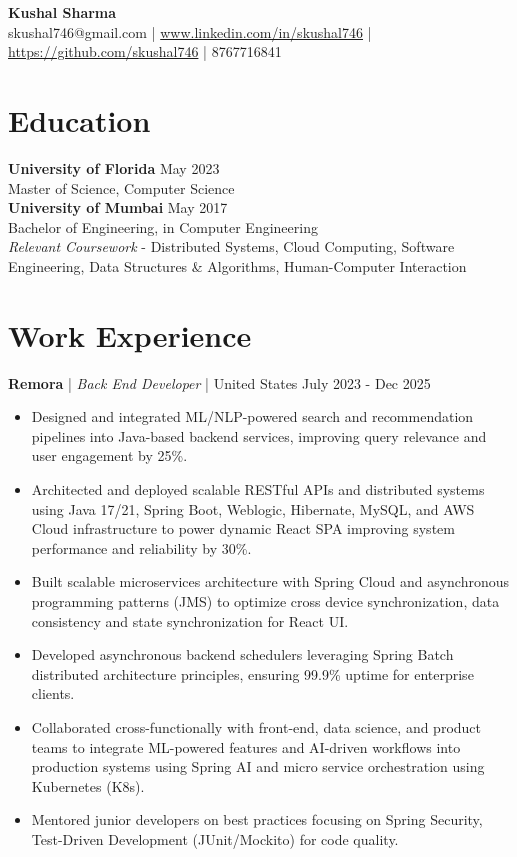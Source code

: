 \documentclass[9pt,letterpaper]{extarticle}
\begin{document}
\begin{center}
    {\LARGE \textbf{Kushal Sharma}} \\ 
    \vspace{2pt}
    skushal746@gmail.com | \href{https://www.linkedin.com/in/skushal746}{www.linkedin.com/in/skushal746} | \href{https://github.com/skushal746}{https://github.com/skushal746} | 8767716841
\end{center}

\section{Education}
\textbf{University of Florida} \hfill May 2023 \\
Master of Science, Computer Science \\
\textbf{University of Mumbai} \hfill May 2017 \\
Bachelor of Engineering, in Computer Engineering \\
\textit{Relevant Coursework} - Distributed Systems, Cloud Computing, Software Engineering, Data Structures \& Algorithms, Human-Computer Interaction

\section{Work Experience}

\textbf{Remora} | \textit{Back End Developer} | United States \hfill July 2023 - Dec 2025
\begin{itemize}[leftmargin=0.15in, noitemsep, topsep=2pt, partopsep=0pt, parsep=0pt]
    \item Designed and integrated ML/NLP-powered search and recommendation pipelines into Java-based backend services, improving query relevance and user engagement by 25\%.
    \item Architected and deployed scalable RESTful APIs and distributed systems using Java 17/21, Spring Boot, Weblogic, Hibernate, MySQL, and AWS Cloud infrastructure to power dynamic React SPA improving system performance and reliability by 30\%.
    \item Built scalable microservices architecture with Spring Cloud and asynchronous programming patterns (JMS) to optimize cross device synchronization, data consistency and state synchronization for React UI.
    \item Developed asynchronous backend schedulers leveraging Spring Batch distributed architecture principles, ensuring 99.9\% uptime for enterprise clients.
    \item Collaborated cross-functionally with front-end, data science, and product teams to integrate ML-powered features and AI-driven workflows into production systems using Spring AI and micro service orchestration using Kubernetes (K8s).
    \item Mentored junior developers on best practices focusing on Spring Security, Test-Driven Development (JUnit/Mockito) for code quality.
\end{itemize}
\end{document}
